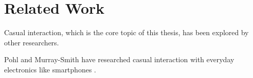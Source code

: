 \chapter{Related Work}
Casual interaction, which is the core topic of this thesis, has been explored by other researchers. %

Pohl and Murray-Smith have researched casual interaction with everyday electronics like smartphones \cite{Pohl2013}.